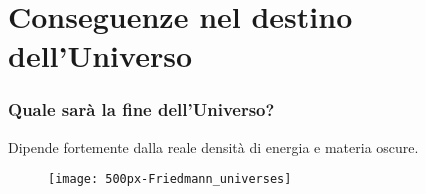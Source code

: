 \section[Conseguenze]{Conseguenze nel destino dell'Universo}

\begin{frame}
  \frametitle{Quale sarà la fine dell'Universo?}
  Dipende fortemente dalla reale densità di energia e materia oscure.
  \begin{figure}
    \centering
    \texttt{[image: 500px-Friedmann\_universes]}
  \end{figure}
\end{frame}

